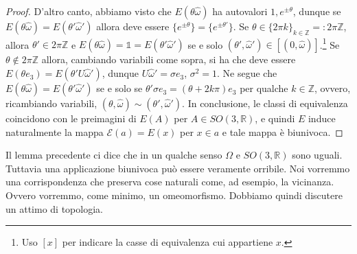 \documentclass{amsart}
\numberwithin{equation}{section}
\newcommand\cE{{\mathcal E}}
\newcommand\bR{{\mathbb R}}
\newcommand\bZ{{\mathbb Z}}
\newcommand\Id{{\mathds{1}}}
\newcommand{\homega}{\hat\omega}
\begin{document}
\begin{proof}
D'altro canto, abbiamo visto che $E(\theta\homega)$ ha autovalori $1,e^{\pm \theta}$, dunque se $E(\theta\homega)=E(\theta'\homega')$ allora deve essere $\{e^{\pm\theta}\}=\{e^{\pm\theta'}\}$. Se $\theta\in \{2\pi k\}_{k\in\bZ}=:2\pi \bZ$, allora $\theta'\in 2\pi \bZ$ e $E(\theta\homega)=\Id=E(\theta'\homega')$ se e solo $(\theta',\homega')\in [(0, \homega)]$.\footnote{ Uso $[x]$ per indicare la casse di equivalenza cui appartiene $x$.} Se $\theta\not \in 2\pi \bZ$ allora, cambiando variabili come sopra, si ha che deve essere $E(\theta e_3)=E(\theta' U\homega')$, dunque $U\homega'=\sigma e_3$, $\sigma^2=1$. Ne segue che $E(\theta\homega)=E(\theta'\homega')$ se e solo se $\theta' \sigma e_3=(\theta+2k \pi)e_3$ per qualche $k\in\bZ$, ovvero, ricambiando variabili, $(\theta,\homega)\sim(\theta',\homega')$. In conclusione, le classi di equivalenza coincidono con le preimagini di $E(A)$ per $A\in SO(3,\bR)$, e quindi $E$ induce naturalmente la mappa $\cE(a)=E(x)$ per $x\in a$ e tale mappa \`e biunivoca.
\end{proof}
Il lemma precedente ci dice che in un qualche senso $\Omega$ e $SO(3,\bR)$ sono uguali. Tuttavia una applicazione biunivoca pu\`o essere veramente orribile. Noi vorremmo una corrispondenza che preserva cose naturali come, ad esempio, la vicinanza. Ovvero vorremmo, come minimo, un omeomorfismo. Dobbiamo quindi discutere un attimo di topologia.
\end{document}
